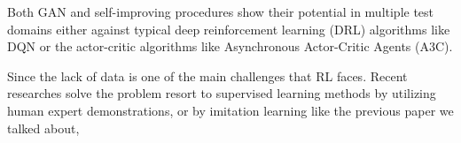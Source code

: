 Both GAN and self-improving procedures show their potential in multiple test domains either against typical deep reinforcement learning (DRL) algorithms like DQN or the actor-critic algorithms like Asynchronous Actor-Critic Agents (A3C).

Since the lack of data is one of the main challenges that RL faces. Recent researches solve the problem resort to supervised learning methods by utilizing human expert demonstrations, or by imitation learning like the previous paper we talked about,
\clearpage{\pagestyle{empty}\cleardoublepage}
